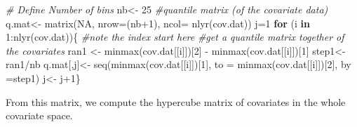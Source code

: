 \documentclass[
]{book}
\newenvironment{Shaded}{\begin{snugshade}}{\end{snugshade}}
\newcommand{\AttributeTok}[1]{\textcolor[rgb]{0.77,0.63,0.00}{#1}}
\newcommand{\CommentTok}[1]{\textcolor[rgb]{0.56,0.35,0.01}{\textit{#1}}}
\newcommand{\ConstantTok}[1]{\textcolor[rgb]{0.00,0.00,0.00}{#1}}
\newcommand{\ControlFlowTok}[1]{\textcolor[rgb]{0.13,0.29,0.53}{\textbf{#1}}}
\newcommand{\DecValTok}[1]{\textcolor[rgb]{0.00,0.00,0.81}{#1}}
\newcommand{\FunctionTok}[1]{\textcolor[rgb]{0.00,0.00,0.00}{#1}}
\newcommand{\NormalTok}[1]{#1}
\newcommand{\OtherTok}[1]{\textcolor[rgb]{0.56,0.35,0.01}{#1}}
\newcommand{\SpecialCharTok}[1]{\textcolor[rgb]{0.00,0.00,0.00}{#1}}
\begin{document}
\begin{Shaded}
\begin{Highlighting}[]
\CommentTok{\# Define Number of bins}
\NormalTok{  nb}\OtherTok{\textless{}{-}} \DecValTok{25}
  \CommentTok{\#quantile matrix (of the covariate data)}
\NormalTok{  q.mat}\OtherTok{\textless{}{-}} \FunctionTok{matrix}\NormalTok{(}\ConstantTok{NA}\NormalTok{, }\AttributeTok{nrow=}\NormalTok{(nb}\SpecialCharTok{+}\DecValTok{1}\NormalTok{), }\AttributeTok{ncol=} \FunctionTok{nlyr}\NormalTok{(cov.dat))}
\NormalTok{  j}\OtherTok{=}\DecValTok{1}
  \ControlFlowTok{for}\NormalTok{ (i }\ControlFlowTok{in} \DecValTok{1}\SpecialCharTok{:}\FunctionTok{nlyr}\NormalTok{(cov.dat))\{ }\CommentTok{\#note the index start here}
  \CommentTok{\#get a quantile matrix together of the covariates}
\NormalTok{    ran1 }\OtherTok{\textless{}{-}} \FunctionTok{minmax}\NormalTok{(cov.dat[[i]])[}\DecValTok{2}\NormalTok{] }\SpecialCharTok{{-}} \FunctionTok{minmax}\NormalTok{(cov.dat[[i]])[}\DecValTok{1}\NormalTok{]}
\NormalTok{    step1}\OtherTok{\textless{}{-}}\NormalTok{ ran1}\SpecialCharTok{/}\NormalTok{nb }
\NormalTok{    q.mat[,j]}\OtherTok{\textless{}{-}} \FunctionTok{seq}\NormalTok{(}\FunctionTok{minmax}\NormalTok{(cov.dat[[i]])[}\DecValTok{1}\NormalTok{], }\AttributeTok{to =} \FunctionTok{minmax}\NormalTok{(cov.dat[[i]])[}\DecValTok{2}\NormalTok{], }\AttributeTok{by =}\NormalTok{step1)}
\NormalTok{    j}\OtherTok{\textless{}{-}}\NormalTok{ j}\SpecialCharTok{+}\DecValTok{1}\NormalTok{\}}
\end{Highlighting}
\end{Shaded}

From this matrix, we compute the hypercube matrix of covariates in the whole covariate space.
\end{document}
